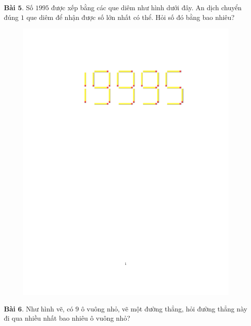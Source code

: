 \begin{multicols}{2}
\begin{figure}[H]
		\vspace*{-5pt}
	\end{figure}
	\textbf{\color{toancuabi}Bài $\pmb{5.}$} Số $1995$ được xếp bằng các que diêm như hình dưới đây. An dịch chuyển đúng $1$ que diêm để nhận được số lớn nhất có thể. Hỏi số đó bằng bao nhiêu?
	\begin{figure}[H]
		\vspace*{-5pt}
		\centering
		\captionsetup{labelformat= empty, justification=centering}
		\includegraphics[width= 1\linewidth]{3}
		\vspace*{-15pt}
	\end{figure}
	\textbf{\color{toancuabi}Bài $\pmb{6.}$} Như hình vẽ, có $9$ ô vuông nhỏ, vẽ một đường thẳng, hỏi đường thẳng này đi qua nhiều nhất bao nhiêu ô vuông nhỏ?
	\begin{figure}[H]
		\vspace*{-5pt}
		\centering
		\captionsetup{labelformat= empty, justification=centering}

\end{figure}
\end{multicols}
